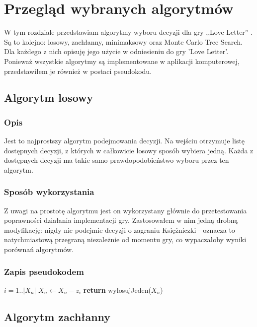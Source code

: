 \chapter{Przegląd wybranych algorytmów}
\label{cha:rozdz3}

W tym rozdziale przedstawiam algorytmy wyboru decyzji dla gry ,,Love Letter''	. Są to kolejno: losowy, zachłanny, minimaksowy oraz Monte Carlo Tree Search. Dla każdego z nich opisuję jego użycie w odniesieniu do gry 'Love Letter'. Ponieważ wszystkie algorytmy są implementowane w aplikacji komputerowej, przedstawiłem je również w postaci pseudokodu.

\section{Algorytm losowy}
\label{sec:algLos}
\subsection{Opis}
Jest to najprostszy algorytm podejmowania decyzji. Na wejściu otrzymuje listę dostępnych decyzji, z których w całkowicie losowy sposób wybiera jedną. Każda z dostępnych decyzji ma takie samo prawdopodobieństwo wyboru przez ten algorytm.

\subsection{Sposób wykorzystania}
Z uwagi na prostotę algorytmu jest on wykorzystany głównie do przetestowania poprawności działania implementacji gry. Zastosowałem w nim jedną drobną modyfikację: nigdy nie podejmie decyzji o zagraniu Księżniczki - oznacza to natychmiastową przegraną niezależnie od momentu gry, co wypaczałoby wyniki porównań algorytmów.

\subsection{Zapis pseudokodem}
\begin{algorithmic}[1]
		 \Comment $i =1..|X_n|$
				\State $X_n \gets X_n - z_i$
			\EndIf
		\EndFor
	\State \textbf{return} wylosujJeden($X_n$) 
	\EndFunction
\end{algorithmic}

\section{Algorytm zachłanny}
\label{sec:algZach}
